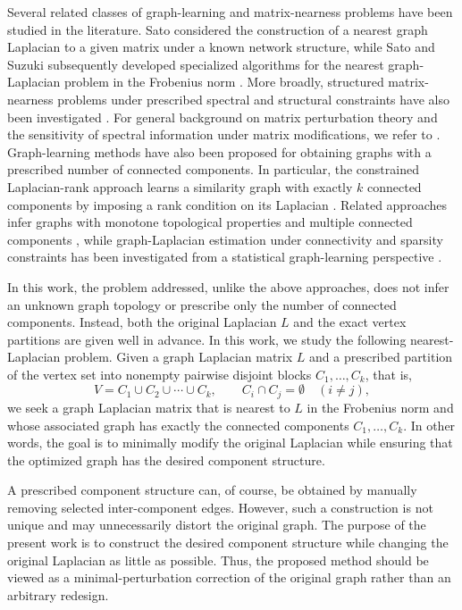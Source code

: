 \documentclass[11pt]{article}
\begin{document}
Several related classes of graph-learning and matrix-nearness
problems have been studied in the literature. Sato considered the
construction of a nearest graph Laplacian to a given matrix under a
known network structure, while Sato and Suzuki subsequently developed
specialized algorithms for the nearest graph-Laplacian problem in the
Frobenius norm \cite{Sato2018,SatoSuzuki2024}. 
More broadly, structured
matrix-nearness problems under prescribed spectral and structural
constraints have also been investigated \cite{PKUD}. For general background on matrix perturbation theory and the
sensitivity of spectral information under matrix modifications, we
refer to \cite{Chung1997}. 
Graph-learning methods
have also been proposed for obtaining graphs with a prescribed number
of connected components. In particular, the constrained Laplacian-rank
approach learns a similarity graph with exactly $k$ connected
components by imposing a rank condition on its Laplacian
\cite{NieEtAl2016}. Related approaches infer graphs with monotone
topological properties and multiple connected components
\cite{PavezEgilmezOrtega2018}, while graph-Laplacian estimation under
connectivity and sparsity constraints has been investigated from a
statistical graph-learning perspective
\cite{EgilmezPavezOrtega2017}.

In this work, the problem addressed, unlike the above approaches, does not infer an unknown graph topology or prescribe only the number of connected components. Instead, both the original Laplacian $L$ and the exact vertex partitions are given well in advance. In this work, we study the following nearest-Laplacian problem. Given a graph Laplacian matrix $L$ and a prescribed partition of the vertex set into nonempty pairwise disjoint blocks
$C_1,\ldots,C_k$, that is,
	\[
	V=C_1\cup C_2\cup\cdots\cup C_k,
	\qquad
	C_i\cap C_j=\emptyset \quad (i\ne j),
	\]
	we seek a graph Laplacian matrix that is nearest to $L$ in the Frobenius norm and whose associated graph has exactly the connected components $C_1,\ldots,C_k$. In other words, the goal is to minimally modify the original Laplacian while ensuring that the optimized graph has the desired component structure.
    
 {A prescribed component structure can, of course, be obtained by manually
	removing selected inter-component edges. However, such a construction is not
	unique and may unnecessarily distort the original graph. The purpose of the
	present work is to construct the desired component structure while changing
	the original Laplacian as little as possible. Thus, the proposed method should
	be viewed as a minimal-perturbation correction of the original graph rather
	than an arbitrary redesign.}
    
\end{document}
